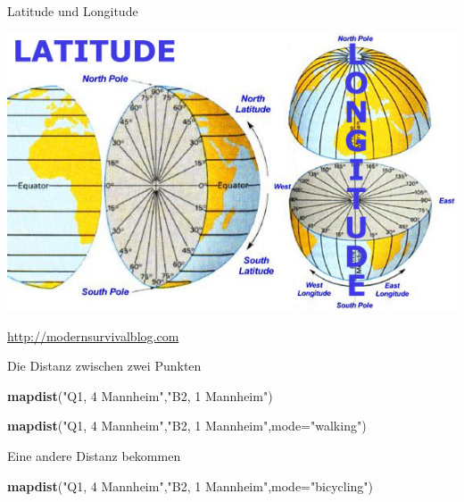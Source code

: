 \documentclass[ignorenonframetext,]{beamer}
\newenvironment{Shaded}{\begin{snugshade}}{\end{snugshade}}
\newcommand{\DataTypeTok}[1]{\textcolor[rgb]{0.13,0.29,0.53}{#1}}
\newcommand{\KeywordTok}[1]{\textcolor[rgb]{0.13,0.29,0.53}{\textbf{#1}}}
\newcommand{\NormalTok}[1]{#1}
\newcommand{\StringTok}[1]{\textcolor[rgb]{0.31,0.60,0.02}{#1}}
\begin{document}
\begin{frame}{Latitude und Longitude}
\protect\hypertarget{latitude-und-longitude}{}

\includegraphics{figure/definition-of-latitude-longitude.jpg}

\href{http://modernsurvivalblog.com/survival-skills/basic-map-reading-latitude-longitude/}{http://modernsurvivalblog.com}

\end{frame}

\begin{frame}[fragile]{Die Distanz zwischen zwei Punkten}
\protect\hypertarget{die-distanz-zwischen-zwei-punkten}{}

\begin{Shaded}
\begin{Highlighting}[]
\KeywordTok{mapdist}\NormalTok{(}\StringTok{"Q1, 4 Mannheim"}\NormalTok{,}\StringTok{"B2, 1 Mannheim"}\NormalTok{)}
\end{Highlighting}
\end{Shaded}

\begin{Shaded}
\begin{Highlighting}[]
\KeywordTok{mapdist}\NormalTok{(}\StringTok{"Q1, 4 Mannheim"}\NormalTok{,}\StringTok{"B2, 1 Mannheim"}\NormalTok{,}\DataTypeTok{mode=}\StringTok{"walking"}\NormalTok{)}
\end{Highlighting}
\end{Shaded}

\begin{block}{Eine andere Distanz bekommen}

\begin{Shaded}
\begin{Highlighting}[]
\KeywordTok{mapdist}\NormalTok{(}\StringTok{"Q1, 4 Mannheim"}\NormalTok{,}\StringTok{"B2, 1 Mannheim"}\NormalTok{,}\DataTypeTok{mode=}\StringTok{"bicycling"}\NormalTok{)}
\end{Highlighting}
\end{Shaded}

\end{block}

\end{frame}
\end{document}
